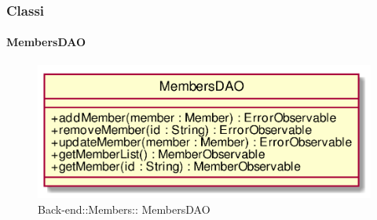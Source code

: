 \subsubsection{Classi}
\hypertarget{ MembersDAO_label}{\paragraph{ MembersDAO}}
\begin{figure}[h]
	\centering
	\includegraphics[width=\textwidth,height=\textheight,keepaspectratio]{images/Class_MembersDAO.png}
	\caption{Back-end::Members:: MembersDAO}
\end{figure}
